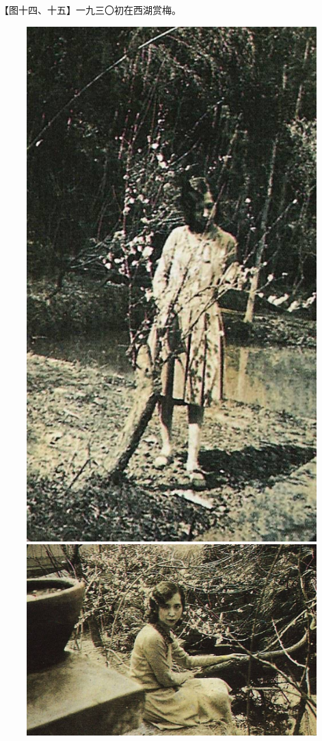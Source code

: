 \clearpage
\par 【图十四、十五】一九三〇初在西湖赏梅。
\begin{figure}[htb]
    \centering %
    \includegraphics[scale=0.35]{picture/对照记14.jpeg}
    \includegraphics[scale=0.35]{picture/对照记15.jpeg}
\end{figure}


